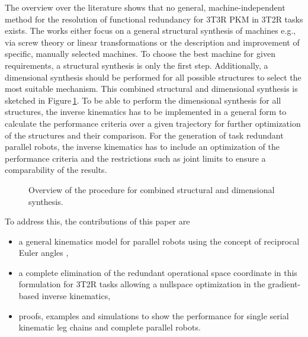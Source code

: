 \documentclass[robotics,article,accept,moreauthors,pdftex]{Definitions/mdpi}
\begin{document}
The overview over the literature shows\deleted[id=Sp]{,} that no general, machine-independent method for the resolution of functional redundancy for 3T3R PKM in 3T2R tasks exists.
The works either focus on a general structural synthesis of machines\added[id=Sp]{,} e.g., via screw theory \cite{KongGos2005} or linear transformations \cite{Gogu2006} or the description and improvement of specific, manually selected\deleted[id=Sp]{,} machines.
To choose the best machine for given requirements, a structural synthesis is only the first step.
Additionally, a dimensional synthesis should be performed for all possible structures to select the most suitable mechanism.
This combined structural and dimensional synthesis \cite{RamirezKotOrt2015} is sketched in Figure\,\ref{fig:structdimsynth}.
To be able to perform the dimensional synthesis for all structures, the inverse kinematics has to be implemented in a general form\deleted[id=Sp]{,} to calculate the performance criteria over a given trajectory for further optimization of the structures and their comparison.
For the generation of task redundant parallel robots, the inverse kinematics has to include an optimization of the performance criteria and the restrictions such as joint limits\deleted[id=Sp]{,} to ensure a comparability of the results.
%
\begin{figure}[tb]
	
	\caption{Overview of the procedure for combined structural and dimensional synthesis.}
	\label{fig:structdimsynth}
\end{figure} 
%
%
To address this, the contributions of this paper are
\begin{itemize}
\item a general kinematics model for parallel robots using the concept of reciprocal Euler angles \cite{1_SchapplerTapOrt2019},
\item a complete elimination of the redundant operational space coordinate in this formulation for 3T2R tasks allowing a nullspace optimization in the gradient-based inverse kinematics,
\item proofs, examples and simulations to show the performance for single serial kinematic leg chains and complete parallel robots.
\end{itemize}
\end{document}
